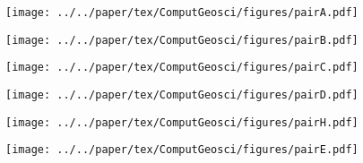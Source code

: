 \begin{figure*}[tbp]
  \captionsetup[subfigure]{singlelinecheck=off,justification=raggedright,aboveskip=-6pt,belowskip=-6pt}
  \centering
  \begin{subfigure}[htbp]{.495\textwidth}
    \centering
    \caption{}\label{fig:2traj1}
    \texttt{[image: ../../paper/tex/ComputGeosci/figures/pairA.pdf]}
  \end{subfigure}
  \vspace{.5em}
  \begin{subfigure}[htbp]{.495\textwidth}
    \centering
    \caption{}\label{fig:2traj2}
    \texttt{[image: ../../paper/tex/ComputGeosci/figures/pairB.pdf]}
  \end{subfigure}
  \begin{subfigure}[htbp]{.495\textwidth}
    \centering
    \caption{}\label{fig:2traj3}
    \texttt{[image: ../../paper/tex/ComputGeosci/figures/pairC.pdf]}
  \end{subfigure}
  \vspace{.5em}
  \begin{subfigure}[htbp]{.495\textwidth}
    \centering
    \caption{}\label{fig:2traj4}
    \texttt{[image: ../../paper/tex/ComputGeosci/figures/pairD.pdf]}
  \end{subfigure}
  \begin{subfigure}[htbp]{.495\textwidth}
    \centering
    \caption{}\label{fig:2traj5}
    \texttt{[image: ../../paper/tex/ComputGeosci/figures/pairH.pdf]}
  \end{subfigure}
  \vspace{.5em}
  \begin{subfigure}[htbp]{.495\textwidth}
    \centering
    \caption{}\label{fig:2traj6}
    \texttt{[image: ../../paper/tex/ComputGeosci/figures/pairE.pdf]}
  \end{subfigure}
\end{figure*}%
